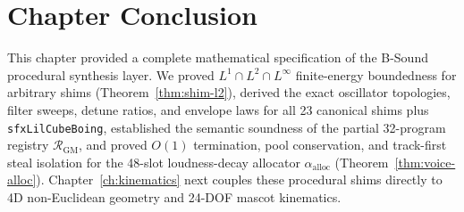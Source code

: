 \section{Chapter Conclusion}

This chapter provided a complete mathematical specification of the B-Sound procedural synthesis layer. We proved $L^1 \cap L^2 \cap L^\infty$ finite-energy boundedness for arbitrary shims (Theorem~\ref{thm:shim-l2}), derived the exact oscillator topologies, filter sweeps, detune ratios, and envelope laws for all 23 canonical shims plus \texttt{sfxLilCubeBoing}, established the semantic soundness of the partial 32-program registry $\mathcal{R}_{\mathrm{GM}}$, and proved $O(1)$ termination, pool conservation, and track-first steal isolation for the 48-slot loudness-decay allocator $\alpha_{\mathrm{alloc}}$ (Theorem~\ref{thm:voice-alloc}). Chapter~\ref{ch:kinematics} next couples these procedural shims directly to 4D non-Euclidean geometry and 24-DOF mascot kinematics.
